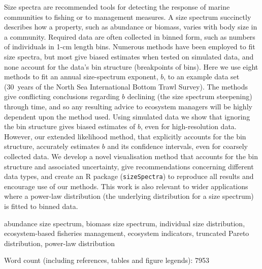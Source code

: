 Size spectra are recommended tools for detecting the
response of marine communities to fishing or to management measures.
A size spectrum succinctly describes how a
property, such as abundance or biomass, varies with body size in a
community.
Required
data are often collected in binned form, such as numbers of individuals
in 1-cm length bins.
Numerous methods have been employed to fit size spectra, but most give
biased estimates when tested on simulated data, and none account for
the data's bin structure (breakpoints of bins).
Here we use eight methods to fit an annual size-spectrum
exponent, $b$, to an example data set (30~years of the North Sea
International Bottom Trawl Survey).
The methods give conflicting conclusions regarding $b$ declining
(the size spectrum steepening) through time, and so any resulting advice
to ecosystem managers will be highly dependent upon the method used.
Using simulated data we show that ignoring the bin structure gives biased
estimates of $b$,
even for high-resolution data. However, our extended likelihood method, that
explicitly accounts for the bin structure, accurately estimates $b$ and its
confidence intervals, even for coarsely collected data.
We develop a novel visualisation method that accounts for the bin
structure and associated uncertainty, give
recommendations concerning different data types, and
create an R package ({\tt sizeSpectra}) to reproduce all results and encourage use of our methods.
This work is also relevant to wider applications where
a power-law distribution (the underlying distribution for a size spectrum) is
fitted to binned data.

\vspace{10mm}
 abundance size spectrum, biomass size spectrum,
individual size distribution, ecosystem-based fisheries management,
ecosystem indicators, truncated Pareto distribution, power-law distribution

\medskip
\noindent Word count (including references, tables and figure legends): 7953 %


